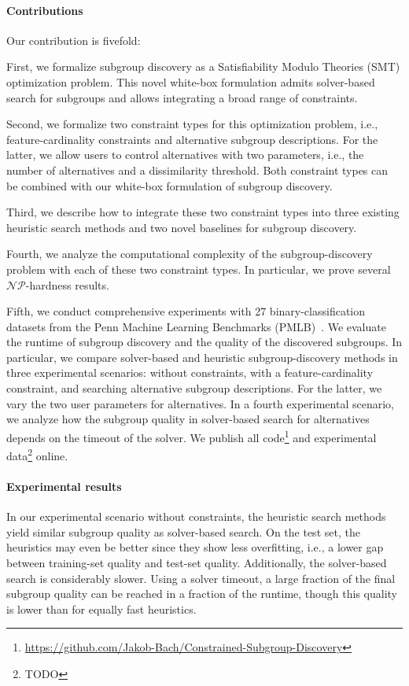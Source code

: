 \documentclass{article}
\theoremstyle{definition}
\begin{document}
\paragraph{Contributions}

Our contribution is fivefold:

First, we formalize subgroup discovery as a Satisfiability Modulo Theories (SMT) optimization problem.
This novel white-box formulation admits solver-based search for subgroups and allows integrating a broad range of constraints.

Second, we formalize two constraint types for this optimization problem, i.e., feature-cardinality constraints and alternative subgroup descriptions.
For the latter, we allow users to control alternatives with two parameters, i.e., the number of alternatives and a dissimilarity threshold.
Both constraint types can be combined with our white-box formulation of subgroup discovery.

Third, we describe how to integrate these two constraint types into three existing heuristic search methods and two novel baselines for subgroup discovery.

Fourth, we analyze the computational complexity of the subgroup-discovery problem with each of these two constraint types.
In particular, we prove several $\mathcal{NP}$-hardness results.

Fifth, we conduct comprehensive experiments with 27 binary-classification datasets from the Penn Machine Learning Benchmarks (PMLB)~\cite{olson2017pmlb, romano2021pmlb}.
We evaluate the runtime of subgroup discovery and the quality of the discovered subgroups.
In particular, we compare solver-based and heuristic subgroup-discovery methods in three experimental scenarios:
without constraints, with a feature-cardinality constraint, and searching alternative subgroup descriptions.
For the latter, we vary the two user parameters for alternatives.
In a fourth experimental scenario, we analyze how the subgroup quality in solver-based search for alternatives depends on the timeout of the solver.
We publish all code\footnote{\url{https://github.com/Jakob-Bach/Constrained-Subgroup-Discovery}} and experimental data\footnote{TODO} online.

\paragraph{Experimental results}

In our experimental scenario without constraints, the heuristic search methods yield similar subgroup quality as solver-based search.
On the test set, the heuristics may even be better since they show less overfitting, i.e., a lower gap between training-set quality and test-set quality.
Additionally, the solver-based search is considerably slower.
Using a solver timeout, a large fraction of the final subgroup quality can be reached in a fraction of the runtime, though this quality is lower than for equally fast heuristics.
\end{document}
